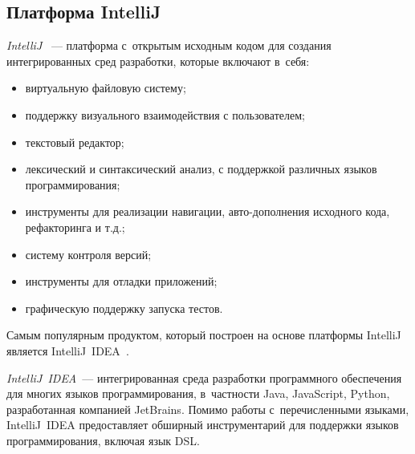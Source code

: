 \subsection{Платформа IntelliJ} \label{sub131}

\textit{IntelliJ} ~--- платформа с~открытым исходным кодом для создания интегрированных сред разработки, которые включают в~себя:

\begin{itemize}
\item{виртуальную файловую систему;}
\item{поддержку визуального взаимодействия с пользователем;}	
\item{текстовый редактор;}	
\item{лексический и синтаксический анализ, с поддержкой различных языков программирования;}
\item{инструменты для реализации навигации, авто-дополнения исходного кода, рефакторинга и т.д.;}
\item{систему контроля версий;}
\item{инструменты для отладки приложений;}
\item{графическую поддержку запуска тестов.}
\end{itemize}

Самым популярным продуктом, который построен на основе платформы IntelliJ является IntelliJ~IDEA~\cite{web4}.

\textit{IntelliJ~IDEA}~--- интегрированная среда разработки программного обеспечения для многих языков программирования, в~частности Java, JavaScript, Python, разработанная компанией JetBrains. Помимо работы с~перечисленными языками, IntelliJ~IDEA предоставляет обширный инструментарий для поддержки языков программирования, включая язык DSL. 